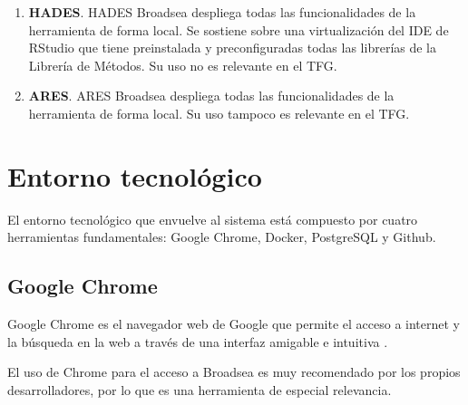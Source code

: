 {\begin{enumerate}
    \begin{itemize}
        \item \textbf{WebAPI}. La WebAPI se despliega como un contenedor docker y como un volumen de datos. Además, también se construirá un esquema en la base de datos del servidor Postgre que aloja al contenedor, denominado . A través de la modificación de este esquema se podrán agregar o eliminar las diferentes fuentes de datos a la herramienta.
        \item \textbf{BD}. Para facilitar el correcto funcionamiento de ATLAS se implementa una base de datos demo que es Eunomia. Esta base de datos cuenta con un pequeño registro de datos normalizados a OMOP y también crea varios esquemas en la base de datos del servidor Postgre que permiten su configuración, o la realización de consultas directamente desde el administrador de la base de datos.
    \end{itemize}

    \item \textbf{HADES}. HADES Broadsea despliega todas las funcionalidades de la herramienta de forma local. Se sostiene sobre una virtualización del IDE de RStudio que tiene preinstalada y preconfiguradas todas las librerías de la Librería de Métodos. Su uso no es relevante en el TFG.
   
    \item \textbf{ARES}. ARES Broadsea despliega todas las funcionalidades de la herramienta de forma local. Su uso tampoco es relevante en el TFG.

\end{enumerate}


\section{Entorno tecnológico} \label{sec:07entorno}

El entorno tecnológico que envuelve al sistema está compuesto por cuatro herramientas fundamentales:  Google Chrome, Docker, PostgreSQL y Github.


\subsection{Google Chrome}

Google Chrome es el navegador web de Google que permite el acceso a internet y la búsqueda en la web a través de una interfaz amigable e intuitiva \cite{GoogleChrome}. 

El uso de Chrome para el acceso a Broadsea es muy recomendado por los propios desarrolladores, por lo que es una herramienta de especial relevancia.

}
